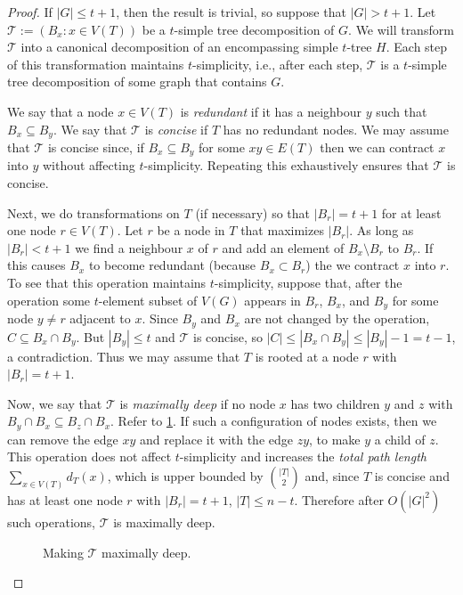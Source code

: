 \documentclass[kpfonts]{patmorin}
\theoremstyle{named}
\begin{document}
\begin{proof}
    If $|G|\le t+1$, then the result is trivial, so suppose that $|G|>t+1$.
    Let $\mathcal{T}:=(B_x:x\in V(T))$ be a $t$-simple tree decomposition of $G$.  We will transform $\mathcal{T}$ into a canonical decomposition of an encompassing simple $t$-tree $H$.  Each step of this transformation maintains $t$-simplicity, i.e., after each step, $\mathcal{T}$ is a $t$-simple tree decomposition of some graph that contains $G$.

    We say that a node $x\in V(T)$ is \emph{redundant} if it has a neighbour $y$ such that $B_x\subseteq B_y$.  We say that $\mathcal{T}$ is \emph{concise} if $T$ has no redundant nodes.  We may assume that $\mathcal{T}$ is concise since,  if $B_x\subseteq B_y$ for some $xy\in E(T)$ then we can contract $x$ into $y$ without affecting $t$-simplicity.  Repeating this exhaustively ensures that $\mathcal{T}$ is concise.

    Next, we do transformations on $T$ (if necessary) so that $|B_r|=t+1$ for at least one node $r\in V(T)$. Let $r$ be a node in $T$ that maximizes $|B_r|$. As long as $|B_r|<t+1$ we find a neighbour $x$ of $r$ and add an element of $B_x\setminus B_r$ to $B_r$.  If this causes $B_x$ to become redundant (because $B_x\subset B_r$) the we contract $x$ into $r$.  To see that this operation maintains $t$-simplicity, suppose that, after the operation some $t$-element subset of $V(G)$ appears in $B_r$, $B_x$, and $B_y$ for some node $y\neq r$ adjacent to $x$.  Since $B_y$ and $B_x$ are not changed by the operation, $C\subseteq B_x\cap B_y$.  But $|B_y|\le t$ and $\mathcal{T}$ is concise, so $|C|\le|B_x\cap B_y|\le|B_y|-1= t-1$, a contradiction. Thus we may assume that $T$ is rooted at a node $r$ with $|B_r|=t+1$.

    Now, we say that $\mathcal{T}$ is \emph{maximally deep} if no node $x$ has two children $y$ and $z$ with $B_y\cap B_x\subseteq B_z\cap B_x$.  Refer to \cref{maximal}.  If such a configuration of nodes exists, then we can remove the edge $xy$ and replace it with the edge $zy$, to make $y$ a child of $z$.  This operation does not affect $t$-simplicity and increases the \emph{total path length} $\sum_{x\in V(T)} d_T(x)$, which is upper bounded by $\binom{|T|}{2}$ and, since $T$ is concise and has at least one node $r$ with $|B_r|=t+1$, $|T|\le n-t$.  Therefore after $O(|G|^2)$ such operations, $\mathcal{T}$ is maximally deep.

    \begin{figure}
        \caption{Making $\mathcal{T}$ maximally deep.}
        \label{maximal}
    \end{figure}


\end{proof}
\end{document}
